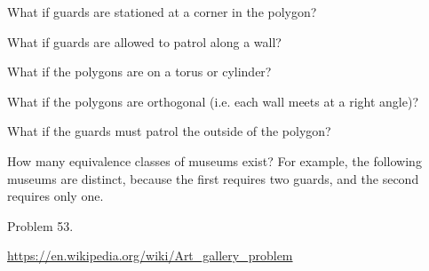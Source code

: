 \documentclass{article}
\begin{document}
\begin{related}
  \item What if guards are stationed at a corner in the polygon?
  \item What if guards are allowed to patrol along a wall?
  \item What if the polygons are on a torus or cylinder?
  \item What if the polygons are orthogonal (i.e. each wall meets at a right angle)?
  \item What if the guards must patrol the outside of the polygon?
  \item How many equivalence classes of museums exist? For example, the
  following museums are distinct, because the first requires two guards, and
  the second requires only one.

  \noindent
  \hspace{0.5cm}
\end{related}
\begin{references}
  \item Problem 53.
  \item \url{https://en.wikipedia.org/wiki/Art_gallery_problem}
\end{references}
\end{document}
